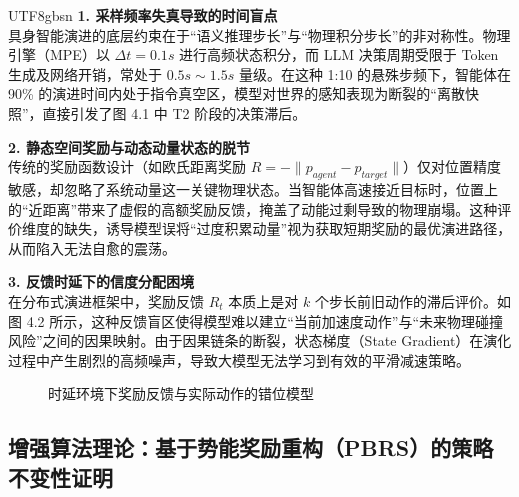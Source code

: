 \documentclass[11pt,a4paper]{article}
\begin{document}
\begin{CJK*}{UTF8}{gbsn}
\noindent \textbf{1. 采样频率失真导致的时间盲点} \\
具身智能演进的底层约束在于“语义推理步长”与“物理积分步长”的非对称性。物理引擎（MPE）以 $\Delta t = 0.1s$ 进行高频状态积分，而 LLM 决策周期受限于 Token 生成及网络开销，常处于 $0.5s \sim 1.5s$ 量级。在这种 1:10 的悬殊步频下，智能体在 90\% 的演进时间内处于指令真空区，模型对世界的感知表现为断裂的“离散快照”，直接引发了图 4.1 中 T2 阶段的决策滞后。

\vspace{1em}
\noindent \textbf{2. 静态空间奖励与动态动量状态的脱节} \\
传统的奖励函数设计（如欧氏距离奖励 $R = -\|p_{agent} - p_{target}\|$）仅对位置精度敏感，却忽略了系统动量这一关键物理状态。当智能体高速接近目标时，位置上的“近距离”带来了虚假的高额奖励反馈，掩盖了动能过剩导致的物理崩塌。这种评价维度的缺失，诱导模型误将“过度积累动量”视为获取短期奖励的最优演进路径，从而陷入无法自愈的震荡。

\vspace{1em}
\noindent \textbf{3. 反馈时延下的信度分配困境} \\
在分布式演进框架中，奖励反馈 $R_t$ 本质上是对 $k$ 个步长前旧动作的滞后评价。如图 4.2 所示，这种反馈盲区使得模型难以建立“当前加速度动作”与“未来物理碰撞风险”之间的因果映射。由于因果链条的断裂，状态梯度（State Gradient）在演化过程中产生剧烈的高频噪声，导致大模型无法学习到有效的平滑减速策略。

\begin{figure}[h!]
\centering
{}
\caption{时延环境下奖励反馈与实际动作的错位模型}
\end{figure}

\subsection{增强算法理论：基于势能奖励重构（PBRS）的策略不变性证明}


\end{CJK*}
\end{document}
